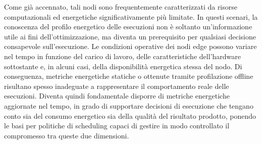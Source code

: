 Come già accennato, tali nodi sono frequentemente caratterizzati da risorse computazionali ed energetiche significativamente più limitate.
In questi scenari, la conoscenza del profilo energetico delle esecuzioni non è soltanto 
un'informazione utile ai fini dell'ottimizzazione, ma diventa un prerequisito per qualsiasi 
decisione consapevole sull'esecuzione. 
Le condizioni operative dei nodi edge possono variare nel tempo in funzione del 
carico di lavoro, delle caratteristiche dell'hardware sottostante e, in alcuni casi, 
della disponibilità energetica stessa del nodo. 
Di conseguenza, metriche energetiche statiche o ottenute tramite profilazione offline 
risultano spesso inadeguate a rappresentare il comportamento reale delle esecuzioni.
Diventa quindi fondamentale disporre di metriche energetiche aggiornate nel tempo, 
in grado di supportare decisioni di esecuzione che tengano conto sia del consumo energetico 
sia della qualità del risultato prodotto, ponendo le basi per politiche di scheduling 
capaci di gestire in modo controllato il compromesso tra queste due dimensioni.


